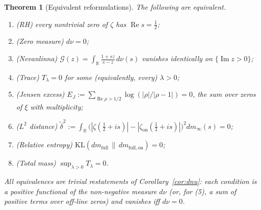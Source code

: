 \documentclass[11pt]{amsart}
\newtheorem{theorem}{Theorem}[section]
\theoremstyle{definition}
\theoremstyle{remark}
\renewcommand{\Re}{\operatorname{Re}}
\renewcommand{\Im}{\operatorname{Im}}
\newcommand{\half}{\tfrac12}
\newcommand{\dnu}{d\nu}
\newcommand{\dmfull}{dm_{\mathrm{full}}}
\newcommand{\dmon}{dm_{\mathrm{full,on}}}
\newcommand{\zon}{\zeta_{\mathrm{on}}}
\newcommand{\Tlam}{T_\lambda}
\begin{document}
\begin{theorem}[Equivalent reformulations]\label{thm:eight}
The following are equivalent.
\begin{enumerate}[\upshape(1)]
\item \textup{(RH)} every nontrivial zero of $\zeta$ has $\Re s=\half$;
\item \textup{(Zero measure)} $\dnu=0$;
\item \textup{(Nevanlinna)} $\mathcal G(z)=\int_{\mathbb R}\frac{1+sz}{s-z}\,\dnu(s)$ vanishes
identically on $\{\Im z>0\}$;
\item \textup{(Trace)} $\Tlam=0$ for some \textup{(}equivalently, every\textup{)} $\lambda>0$;
\item \textup{(Jensen excess)} $E_J:=\sum_{\Re\rho>1/2}\log(|\rho|/|\rho-1|)=0$, the sum over
zeros of $\xi$ with multiplicity;
\item \textup{($L^2$ distance)} $\widetilde\delta^2:=\int_{\mathbb R}\bigl(|\zeta(\half+is)|-
|\zon(\half+is)|\bigr)^2dm_\infty(s)=0$;
\item \textup{(Relative entropy)} $\mathrm{KL}(\dmfull\,\|\,\dmon)=0$;
\item \textup{(Total mass)} $\sup_{\lambda>0}\Tlam=0$.
\end{enumerate}
All equivalences are trivial restatements of Corollary~\ref{cor:dnu}: each condition is a
positive functional of the non-negative measure $\dnu$ \textup{(}or, for \textup{(5)}, a sum of
positive terms over off-line zeros\textup{)} and vanishes iff $\dnu=0$.
\end{theorem}
\end{document}
